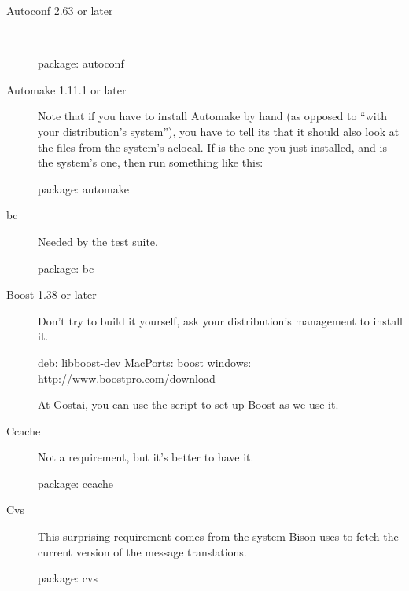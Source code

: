\begin{description}
\item[Autoconf 2.63 or later]~\\

\begin{package}
package: autoconf
\end{package}

\item[Automake 1.11.1 or later] Note that if you have to install Automake by
  hand (as opposed to ``with your distribution's system''), you have to tell
  its  that it should also look at the files from the
  system's aclocal.  If  is the one you just
  installed, and  is the system's one, then run
  something like this:


\begin{package}
package: automake
\end{package}

\item[bc]
  Needed by the test suite.
\begin{package}
package: bc
\end{package}

\item[Boost 1.38 or later] Don't try to build it yourself, ask your
  distribution's management to install it.
\begin{package}
deb: libboost-dev
MacPorts: boost
windows: http://www.boostpro.com/download
\end{package}

At Gostai, you can use the script 
to set up Boost as we use it.

\item[Ccache]
  Not a requirement, but it's better to have it.
\begin{package}
package: ccache
\end{package}

\item[Cvs]
  This surprising requirement comes from the system Bison uses to fetch
  the current version of the message translations.
\begin{package}
package: cvs
\end{package}


\end{description}
